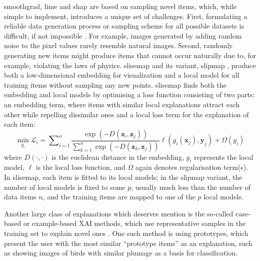 {\sc smoothgrad}, {\sc lime} and {\sc shap} are based on sampling novel items, which, while simple to implement, introduces a unique set of challenges.
First, formulating a reliable data generation process or sampling scheme for all possible datasets is difficult, if not impossible \cite{guidotti2018survey, laugel2018defining}.
For example, images generated by adding random noise to the pixel values rarely resemble natural images.
Second, randomly generating new items might produce items that cannot occur naturally due to, for example, violating the laws of physics.
{\sc slisemap} \cite{bjorklund2023slisemap} and its variant, {\sc slipmap} \cite{bjorklund2024SLIPMAP}, produce both a low-dimensional embedding for visualization and a local model for all training items without sampling any new points.
{\sc slisemap} finds both the embedding and local models by optimising a loss function consisting of two parts: an embedding term, where items with similar local explanations attract each other while repelling dissimilar ones and a local loss term for the explanation of each item:
\begin{equation}
    \min_{g_i} \mathcal{L}_i = \sum\nolimits_{i=1}^n \frac{\exp(-D(\bm{z}_i, \bm{z}_j))}{\sum_{k=1}^n \exp(-D(\bm{z}_k, \bm{z}_j))} \ell(g_i(\bm{x}_j), \bm{y}_j) + \Omega(g_i)
\end{equation}
where $D(\cdot, \cdot)$ is the euclidean distance in the embedding, $g_i$ represents the local model, $\ell$ is the local loss function, and $\Omega$ again denotes regularisation term(s).
In {\sc slisemap}, each item is fitted to its local models; in the {\sc slipmap} variant, the number of local models is fixed to some $p$, usually much less than the number of data items $n$, and the training items are mapped to one of the $p$ local models.

Another large class of explanations which deserves mention is the so-called case-based or example-based XAI methods, which use representative samples in the training set to explain novel ones \cite{agnar1994casebased, kim2016examples}.
One such method is using prototypes, which present the user with the most similar ``prototype items'' as an explanation, such as showing images of birds with similar plumage as a basis for classification. 

